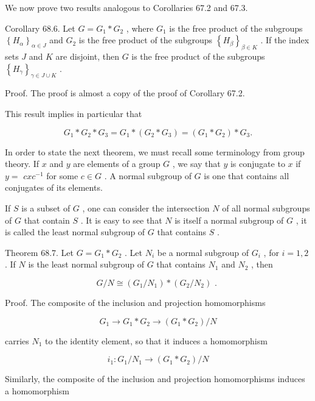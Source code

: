 We now prove two results analogous to Corollaries 67.2 and 67.3.

Corollary 68.6. Let \(G = {G}_{1} * {G}_{2}\) , where \({G}_{1}\) is the free product of the subgroups \({\left\{  {H}_{\alpha }\right\}  }_{\alpha  \in  J}\) and \({G}_{2}\) is the free product of the subgroups \({\left\{  {H}_{\beta }\right\}  }_{\beta  \in  K}\) . If the index sets \(J\) and \(K\) are disjoint, then \(G\) is the free product of the subgroups \({\left\{  {H}_{\gamma }\right\}  }_{\gamma  \in  J \cup  K}\) .

Proof. The proof is almost a copy of the proof of Corollary 67.2.

This result implies in particular that

\[
{G}_{1} * {G}_{2} * {G}_{3} = {G}_{1} * \left( {{G}_{2} * {G}_{3}}\right)  = \left( {{G}_{1} * {G}_{2}}\right)  * {G}_{3}.
\]

In order to state the next theorem, we must recall some terminology from group theory. If \(x\) and \(y\) are elements of a group \(G\) , we say that \(y\) is conjugate to \(x\) if \(y =\)  \({cx}{c}^{-1}\) for some \(c \in  G\) . A normal subgroup of \(G\) is one that contains all conjugates of its elements.

If \(S\) is a subset of \(G\) , one can consider the intersection \(N\) of all normal subgroups of \(G\) that contain \(S\) . It is easy to see that \(N\) is itself a normal subgroup of \(G\) , it is called the least normal subgroup of \(G\) that contains \(S\) .

Theorem 68.7. Let \(G = {G}_{1} * {G}_{2}\) . Let \({N}_{i}\) be a normal subgroup of \({G}_{i}\) , for \(i = 1,2\) . If \(N\) is the least normal subgroup of \(G\) that contains \({N}_{1}\) and \({N}_{2}\) , then

\[
G/N \cong  \left( {{G}_{1}/{N}_{1}}\right)  * \left( {{G}_{2}/{N}_{2}}\right) \text{ . }
\]

Proof. The composite of the inclusion and projection homomorphisms

\[
{G}_{1} \rightarrow  {G}_{1} * {G}_{2} \rightarrow  \left( {{G}_{1} * {G}_{2}}\right) /N
\]

carries \({N}_{1}\) to the identity element, so that it induces a homomorphism

\[
{i}_{1} : {G}_{1}/{N}_{1} \rightarrow  \left( {{G}_{1} * {G}_{2}}\right) /N
\]

Similarly, the composite of the inclusion and projection homomorphisms induces a homomorphism

